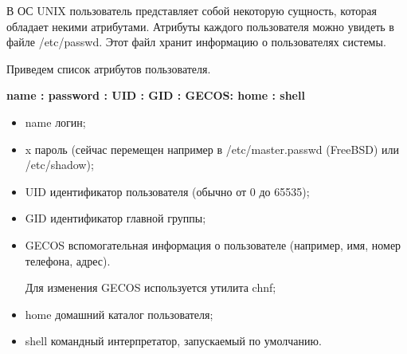 В ОС UNIX пользователь представляет собой некоторую сущность, которая обладает некими атрибутами. Атрибуты каждого пользователя можно увидеть в файле /etc/passwd. Этот файл хранит информацию о пользователях системы.

Приведем список атрибутов пользователя.

\textbf{name : password : UID : GID : GECOS: home : shell}

\begin{itemize}

	\item \begin{defi}{name} 
			логин;
			\end{defi}
	
	\item \begin{defi}{x} 
			пароль (сейчас перемещен например в /etc/master.passwd (FreeBSD) или /etc/shadow);
			\end{defi}
			
	\item \begin{defi}{UID}
			идентификатор пользователя (обычно от 0 до 65535);
			\end{defi}
			
	\item \begin{defi}{GID}
			идентификатор главной группы;
			\end{defi}
			
	\item \begin{defi}{GECOS}
			вспомогательная информация о пользователе (например, имя, номер телефона, адрес).
			
			Для изменения GECOS используется утилита chnf;
			\end{defi}
			
	\item \begin{defi}{home}
			домашний каталог пользователя;
			\end{defi}
			
	\item \begin{defi}{shell} 
			командный интерпретатор, запускаемый по умолчанию.
			\end{defi}
			
\end{itemize}
